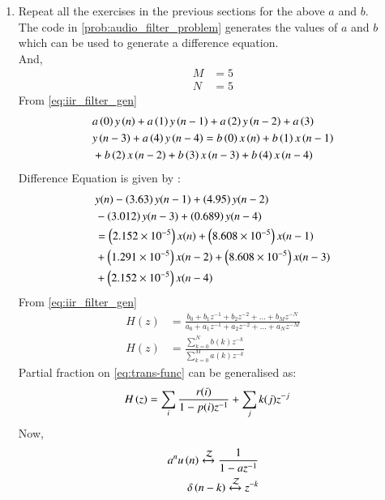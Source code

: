 \documentclass[journal,12pt,twocolumn]{IEEEtran}
\theoremstyle{remark}
\begin{document}
\begin{enumerate}[label=\thesection.\arabic*,ref=\thesection.\theenumi]
\item Repeat all the exercises in the previous sections for the above $a$ and $b$.\\
\solution The code in \ref{prob:audio_filter_problem} generates the values of $a$ and $b$  which can be used to generate a difference equation.\\
And,
\begin{align}
    M &= 5\\
    N&=5
\end{align}
From \ref{eq:iir_filter_gen} 
\begin{align}
    &a\left(0\right)y\left(n\right) + a\left(1\right)y\left(n-1\right)+a\left(2\right)y\left(n-2\right)+a\left(3\right)\\ \notag &y\left(n-3\right) + a\left(4\right)y\left(n-4\right) =   b\left(0\right)x\left(n\right) + b\left(1\right)x\left(n-1\right)\\ \notag &+b\left(2\right)x\left(n-2\right)+b\left(3\right)x\left(n-3\right) + b\left(4\right)x\left(n-4\right) 
\end{align}
Difference Equation is given by :
\begin{align}
	&y(n) - \left(3.63\right)y(n - 1) + \left(4.95\right)y(n - 2) \nonumber \\
	&- \left(3.012\right)y(n - 3) + \left(0.689\right)y(n - 4) \nonumber \\
	&= \left(2.152\times 10^{-5}\right)x(n) + \left(8.608 \times 10^{-5}\right)x(n - 1) \nonumber \\
	&+ \left(1.291 \times 10^{-5}\right)x(n - 2) + \left(8.608 \times 10^{-5}\right)x(n - 3) \nonumber \\
	&+ \left(2.152 \times 10^{-5}\right)x(n - 4)
\end{align}
From \eqref{eq:iir_filter_gen} 
\begin{align}
    H(z) &= \frac{b_0 + b_1 z^{-1} + b_2 z^{-2} + \ldots + b_M z^{-N}}{a_0 + a_1 z^{-1} + a_2 z^{-2} + \ldots + a_N z^{-M}}\\
    H(z) &= \frac{\sum_{k = 0}^{N}b(k)z^{-k}}{\sum_{k = 0}^{M}a(k)z^{-k}} \label{eq:trans-func}
\end{align}
Partial fraction on \eqref{eq:trans-func} can be generalised as:
\begin{align}
    H\left(z\right)&= \sum_{i}\frac{r(i)}{1 - p(i)z^{-1}} + \sum_{j}k(j)z^{-j}
	\label{eq:trans-func-pfe}
\end{align}
Now,
\begin{align}
    a^{n}u\left(n\right) \xleftrightarrow{\mathcal{Z}} \frac{1}{1-az^{-1}} \label{eq:res-1}\\
    \delta\left(n-k\right) \xleftrightarrow{\mathcal{Z}} z^{-k}\label{eq:res-2}
\end{align}

\end{enumerate}
\end{document}
